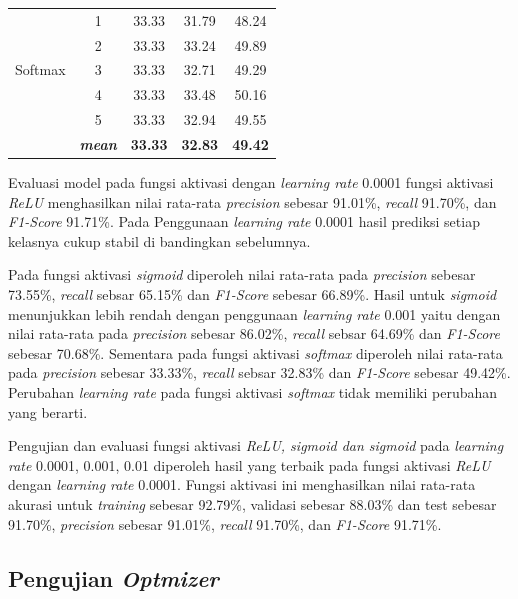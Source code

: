 \begin{table}[H]
\begin{table}[H]
\begin{tabular}{ccccc}
            \multirow{5}{*}{Softmax}
            & 1 & 33.33  & 31.79 & 48.24 \\
            & 2 & 33.33  & 33.24 & 49.89 \\
            & 3 & 33.33  & 32.71 & 49.29 \\
            & 4 & 33.33  & 33.48 & 50.16 \\
            & 5 & 33.33  & 32.94 & 49.55 \\
            & \textit{\textbf{mean}}& \textbf{33.33} & \textbf{32.83} &\textbf{49.42} \\ 
    

            \bottomrule
        \end{tabular}
        \label{Evaluasi Learning Rate 0.0001 }
    \end{table}

      Evaluasi model pada fungsi aktivasi dengan \textit{learning rate} 0.0001 fungsi aktivasi \textit{ReLU} menghasilkan nilai rata-rata \textit{precision} sebesar 91.01\%, \textit{recall} 91.70\%, dan\textit{ F1-Score} 91.71\%. Pada 
      Penggunaan \textit{learning rate} 0.0001 hasil prediksi setiap kelasnya cukup stabil di bandingkan sebelumnya. 
      
      Pada fungsi aktivasi \textit{sigmoid} diperoleh nilai rata-rata pada \textit{precision} sebesar 73.55\%, \textit{recall} sebsar 65.15\% dan\textit{ F1-Score} sebesar 66.89\%. Hasil untuk \textit{sigmoid} menunjukkan lebih rendah dengan penggunaan \textit{learning rate} 0.001 yaitu dengan nilai rata-rata pada \textit{precision} sebesar 86.02\%, \textit{recall} sebsar 64.69\% dan\textit{ F1-Score} sebesar 70.68\%. Sementara pada fungsi aktivasi \textit{softmax} diperoleh nilai rata-rata pada \textit{precision} sebesar 33.33\%, \textit{recall} sebsar 32.83\% dan\textit{ F1-Score} sebesar 49.42\%.
     Perubahan \textit{learning rate} pada fungsi aktivasi \textit{softmax} tidak memiliki perubahan yang berarti. 
     
     
     
    Pengujian dan evaluasi fungsi aktivasi \textit{ReLU, sigmoid dan sigmoid} pada \textit{learning rate} 0.0001, 0.001, 0.01 diperoleh hasil yang terbaik pada  fungsi aktivasi \textit{ReLU} dengan \textit{learning rate} 0.0001. Fungsi aktivasi ini menghasilkan nilai rata-rata  akurasi untuk \textit{training} sebesar 92.79\%, validasi sebesar 88.03\% dan test sebesar 91.70\%, \textit{precision} sebesar 91.01\%, \textit{recall} 91.70\%, dan\textit{ F1-Score} 91.71\%.

\subsection{Pengujian \textit{Optmizer}}


\end{table}
